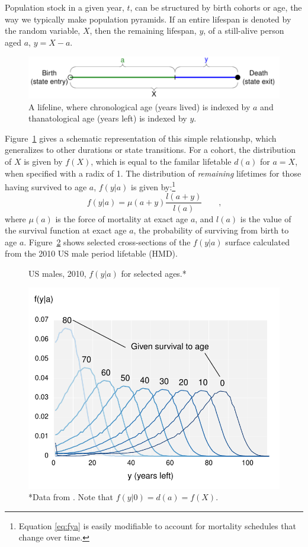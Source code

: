 \documentclass{article}
\newcommand{\tc}{\quad\quad\text{,}}
\begin{document}
Population stock in a given year, $t$, can be structured by birth
cohorts or age, the way we typically make population pyramids. If an entire
lifespan is denoted by the random variable, $X$, then the remaining lifespan,
$y$, of a still-alive person aged $a$, $y = X - a$. 
\begin{figure}[h]
\centering
	\caption{A lifeline, where chronological age (years lived) is indexed by $a$
	and thanatological age (years left) is indexed by $y$.}
	\label{fig:line}
	\includegraphics[scale=.8]{Figures/LifeLine.pdf}	
\end{figure}
Figure~\ref{fig:line} gives a schematic representation of this simple
relationshp, which generalizes to other durations or state transitions. For a
cohort, the distribution of $X$ is given by $f(X)$, which is equal to the familar lifetable
$d(a)$ for $a = X$, when specified with a radix of 1. The distribution of
\textit{remaining} lifetimes for those having survived to age $a$, $f(y|a)$ is
given by:\footnote{Equation \eqref{eq:fya} is easily modifiable to account for
mortality schedules that change over time.}
\begin{equation}
\label{eq:fya}
f(y|a) = \mu(a+y) \frac{l(a+y)}{l(a)} \tc
\end{equation}
where $\mu(a)$ is the force of mortality at exact age $a$, and $l(a)$ is
the value of the survival function at exact age $a$, the probability of
surviving from birth to age $a$. Figure~\ref{fig:fya} shows selected
cross-sections of the $f(y|a)$ surface calculated from the 2010 US male period lifetable (HMD). 
\begin{figure}[h]
\centering
	\caption{US males, 2010, $f(y|a)$ for selected ages.*}
	\label{fig:fya}
	\includegraphics[scale=.8]{Figures/fya.pdf}	
	\caption*{*Data from . Note that $f(y|0) = d(a) = f(X)$.}
\end{figure}
\end{document}
